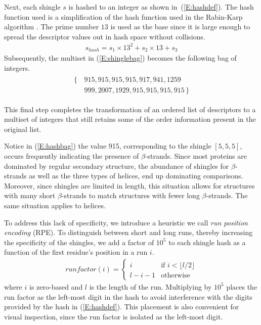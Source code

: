 \documentclass[letter,center,fleqn]{NAR}
\begin{document}
Next, each shingle $s$ is hashed to an integer as shown in~(\ref{E:hashdef}). 
The hash function used is a simplification of the hash function used in the Rabin-Karp algorithm \cite{Karp1987}.
The prime number $13$ is used as the base since it is large enough to spread the descriptor values out in hash space without collisions. 
\begin{gather}\label{E:hashdef}
    s_{hash} = s_1 \times 13^2 + s_2 \times 13 + s_3
\end{gather}
Subsequently, the multiset in (\ref{E:shinglebag}) becomes the following bag of integers.
\begin{align}\label{E:hashbag}
    \begin{split}
    \{\,&915, 915, 915, 915, 917, 941, 1259 \\
        &999, 2007, 1929, 915, 915, 915, 915 \,\}
    \end{split}
\end{align}

This final step completes the transformation of an ordered list of descriptors to a multiset of integers that still retains some of the order information present in the original list. 

Notice in (\ref{E:hashbag}) the value 915, corresponding to the shingle $[ 5, 5, 5 ]$, occurs frequently indicating the presence of $\beta$-strands. 
Since most proteins are dominated by regular secondary structure, the abundance of shingles for $\beta$-strands as well as the three types of helices, end up dominating comparisons. 
Moreover, since shingles are limited in length, this situation allows for structures with many short $\beta$-strands to match structures with fewer long $\beta$-strands.
The same situation applies to helices. 

To address this lack of specificity, we introduce a heuristic we call \emph{run position encoding} (RPE). 
To distinguish between short and long runs, thereby increasing the specificity of the shingles, we add a factor of $10^5$ to each shingle hash as a function of the first residue's position in a run $i$. 
\begin{gather}
    runfactor(i) = 
    \begin{cases}
        i               &\text{if $i < \lfloor l/2 \rfloor$}\\
        l - i - 1       &\text{otherwise} 
    \end{cases}
\end{gather}
where $i$ is zero-based and $l$ is the length of the run. 
Multiplying by $10^5$ places the run factor as the left-most digit in the hash to avoid interference with the digits provided by the hash in (\ref{E:hashdef}).
This placement is also convenient for visual inspection, since the run factor is isolated as the left-most digit. 
\end{document}
